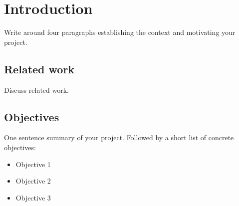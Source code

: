 \section{Introduction}

Write around four paragraphs establishing the context and motivating your project.

\subsection{Related work}

Discuss related work.

\subsection{Objectives}

One sentence summary of your project. Followed by a short list of concrete objectives:

\begin{itemize}
    \item Objective 1
    \item Objective 2
    \item Objective 3
\end{itemize}